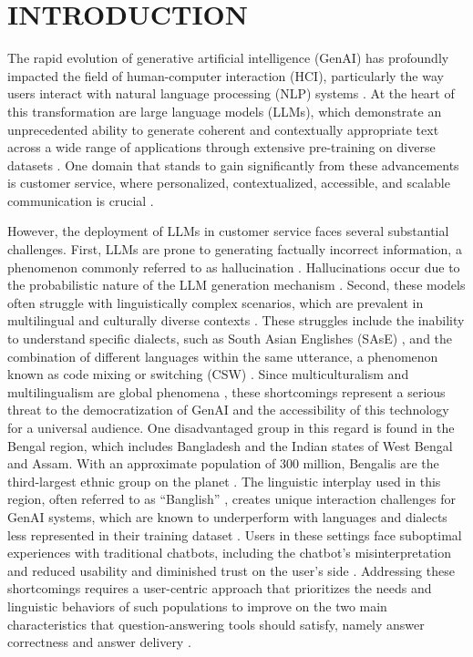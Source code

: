 \documentclass[sigconf]{acmart}
\begin{document}
\section{INTRODUCTION}

The rapid evolution of generative artificial intelligence (GenAI) has profoundly impacted the field of human-computer interaction (HCI), particularly the way users interact with natural language processing (NLP) systems \cite{shi2023hci}. At the heart of this transformation are large language models (LLMs), which demonstrate an unprecedented ability to generate coherent and contextually appropriate text across a wide range of applications through extensive pre-training on diverse datasets \cite{lee2022coauthor}. One domain that stands to gain significantly from these advancements is customer service, where personalized, contextualized, accessible, and scalable communication is crucial \cite{rapp2023collaborating}.

However, the deployment of LLMs in customer service faces several substantial challenges. First, LLMs are prone to generating factually incorrect information, a phenomenon commonly referred to as hallucination \cite{leiser2024hill}. Hallucinations occur due to the probabilistic nature of the LLM generation mechanism \cite{leiser2024hill}. Second, these models often struggle with linguistically complex scenarios, which are prevalent in multilingual and culturally diverse contexts \cite{choi2023toward}. These struggles include the inability to understand specific dialects, such as South Asian Englishes (SAsE) \cite{gargesh2019south}, and the combination of different languages within the same utterance, a phenomenon known as code mixing or switching (CSW) \cite{mitra2023mixed}. Since multiculturalism and multilingualism are global phenomena \cite{chen2008bicultural}, these shortcomings represent a serious threat to the democratization of GenAI and the accessibility of this technology for a universal audience. One disadvantaged group in this regard is found in the Bengal region, which includes Bangladesh and the Indian states of West Bengal and Assam. With an approximate population of 300 million, Bengalis are the third-largest ethnic group on the planet \cite{enwiki:1268353351,worldfactbook}. The linguistic interplay used in this region, often referred to as “Banglish” \cite{mostafa2012english}, creates unique interaction challenges for GenAI systems, which are known to underperform with languages and dialects less represented in their training dataset \cite{alexandris2024genai}. Users in these settings face suboptimal experiences with traditional chatbots, including the chatbot's misinterpretation and reduced usability and diminished trust on the user's side \cite{choi2023toward}. Addressing these shortcomings requires a user-centric approach that prioritizes the needs and linguistic behaviors of such populations to improve on the two main characteristics that question-answering tools should satisfy, namely answer correctness and answer delivery \cite{shi2023hci}.
\end{document}
